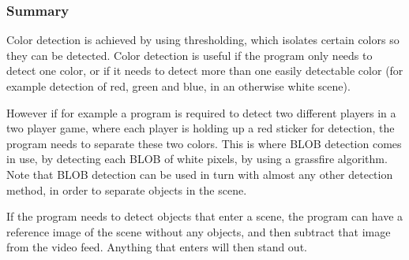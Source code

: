 \subsubsection{Summary}
Color detection is achieved by using thresholding, which isolates certain colors so they can be detected. Color detection is useful if the program only needs to detect one color, or if it needs to detect more than one easily detectable color (for example detection of red, green and blue, in an otherwise white scene).

However if for example a program is required to detect two different players in a two player game, where each player is holding up a red sticker for detection, the program needs to separate these two colors. This is where BLOB detection comes in use, by detecting each BLOB of white pixels, by using a grassfire algorithm. Note that BLOB detection can be used in turn with almost any other detection method, in order to separate objects in the scene.

If the program needs to detect objects that enter a scene, the program can have a reference image of the scene without any objects, and then subtract that image from the video feed. Anything that enters will then stand out. \parencite{Moeslund2012}
